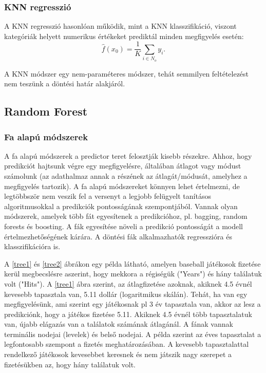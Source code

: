 \documentclass[12pt]{article}
\theoremstyle{plain}
\begin{document}
\subsubsection*{KNN regresszió}
A KNN regresszió hasonlóan működik, mint a KNN klasszifikáció, viszont kategóriák helyett numerikus értékeket prediktál minden megfigyelés esetén: $$ \hat{f}(x_0)=\frac{1}{K} \sum_{i \in N_o} y_i.$$ 

A KNN módszer egy nem-paraméteres módszer, tehát semmilyen feltételezést nem teszünk a döntési határ alakjáról. 


\subsection{Random Forest}
\subsubsection{Fa alapú módszerek}
A fa alapú módszerek a predictor teret felosztják kisebb részekre. Ahhoz, hogy predikciót hajtsunk végre egy megfigyelésre, általában átlagot vagy módust számolunk (az adathalmaz annak a részének az átlagát/módusát, amelyhez a megfigyelés tartozik). A fa alapú módszereket könnyen lehet értelmezni, de legtöbbször nem veszik fel a versenyt a legjobb felügyelt tanításos algoritmusokkal a predikciók pontosságának szempontjából. Vannak olyan módszerek, amelyek több fát egyesítenek a predikcióhoz, pl. bagging, random forests és boosting. A fák egyesítése növeli a predikció pontosságát a modell értelmezhetőségének kárára. A döntési fák alkalmazhatók regresszióra és klasszifikációra is. 

A \ref{tree1} és \ref{tree2} ábrákon egy példa látható, amelyen baseball játékosok fizetése kerül megbecslésre aszerint, hogy mekkora a régiségük ("Years") és hány találatuk volt ("Hits"). A \ref{tree1} ábra szerint, az átlagfizetése azoknak, akiknek 4.5 évnél kevesebb tapasztala van, 5.11 dollár (logaritmikus skálán). Tehát, ha van egy megfigyelésünk, ami szerint egy játékosnak pl 3 év tapasztala van, akkor az lesz a predikciónk, hogy a játékos fizetése 5.11. Akiknek 4.5 évnél több tapasztalatuk van, újabb elágazás van a találatok számának átlagánál. A fának vannak terminális nodejai (levelek) és belső nodejai. A példa szerint az éves tapasztalat a legfontosabb szempont a fizetés meghatározásában. A kevesebb tapasztalattal rendelkező játékosok kevesebbet keresnek és nem játszik nagy szerepet a fizetésükben az, hogy hány találatuk volt. 
\end{document}
